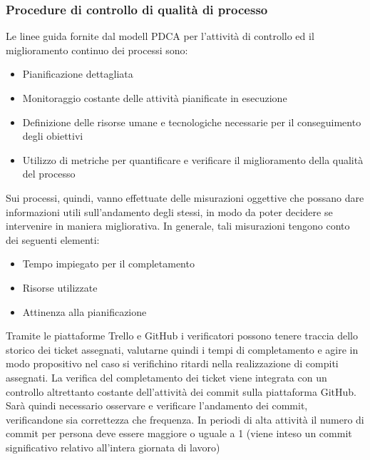 \documentclass[a4paper,11pt]{article}
\begin{document}
\subsubsection{Procedure di controllo di qualità di processo}
Le linee guida fornite dal modell PDCA per l'attività di controllo ed il miglioramento continuo dei processi sono:
\begin{itemize}
\item Pianificazione dettagliata
\item Monitoraggio costante delle attività pianificate in esecuzione
\item Definizione delle risorse umane e tecnologiche necessarie per il conseguimento degli obiettivi
\item Utilizzo di metriche per quantificare e verificare il miglioramento della qualità del processo
\end{itemize}  
Sui processi, quindi, vanno effettuate delle misurazioni oggettive che possano dare informazioni utili sull'andamento degli stessi, in modo da poter decidere se intervenire in maniera migliorativa. 
In generale, tali misurazioni tengono conto dei seguenti elementi: 
\begin{itemize}
\item Tempo impiegato per il completamento
\item Risorse utilizzate 
\item Attinenza alla pianificazione
\end{itemize}
Tramite le piattaforme Trello e GitHub i verificatori possono tenere traccia dello storico dei ticket assegnati, valutarne quindi i tempi di completamento e agire in modo propositivo nel caso si verifichino ritardi nella realizzazione di compiti assegnati.
La verifica del completamento dei ticket viene integrata con un controllo altrettanto costante dell'attività dei commit sulla piattaforma GitHub. Sarà quindi necessario osservare e verificare l'andamento dei commit, verificandone sia correttezza che frequenza.
In periodi di alta attività il numero di commit per persona deve essere maggiore o uguale a 1 (viene inteso un commit significativo relativo all'intera giornata di lavoro) 
\end{document}
